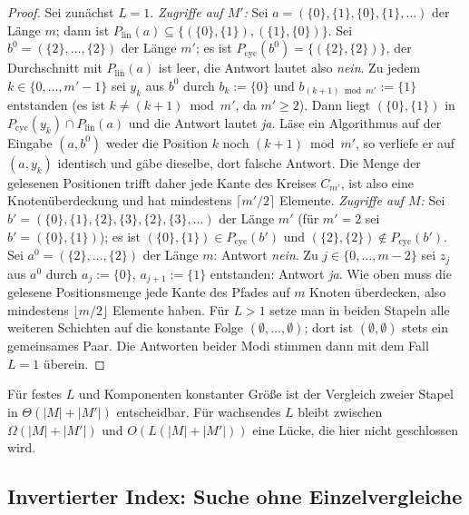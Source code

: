 \begin{proof}
	Sei zunächst $L=1$.
	\emph{Zugriffe auf $M'$:} Sei $a=(\{0\},\{1\},\{0\},\{1\},\dots)$ der Länge $m$; dann ist $P_{\mathrm{lin}}(a)\subseteq\{(\{0\},\{1\}),(\{1\},\{0\})\}$. Sei $b^0=(\{2\},\dots,\{2\})$ der Länge $m'$; es ist $P_{\mathrm{cyc}}(b^0)=\{(\{2\},\{2\})\}$, der Durchschnitt mit $P_{\mathrm{lin}}(a)$ ist leer, die Antwort lautet also \emph{nein}. Zu jedem $k\in\{0,\dots,m'-1\}$ sei $y_k$ aus $b^0$ durch $b_k:=\{0\}$ und $b_{(k+1)\bmod m'}:=\{1\}$ entstanden (es ist $k\ne(k+1)\bmod m'$, da $m'\ge2$). Dann liegt $(\{0\},\{1\})$ in $P_{\mathrm{cyc}}(y_k)\cap P_{\mathrm{lin}}(a)$ und die Antwort lautet \emph{ja}. Läse ein Algorithmus auf der Eingabe $(a,b^0)$ weder die Position $k$ noch $(k+1)\bmod m'$, so verliefe er auf $(a,y_k)$ identisch und gäbe dieselbe, dort falsche Antwort. Die Menge der gelesenen Positionen trifft daher jede Kante des Kreises $C_{m'}$, ist also eine Knotenüberdeckung und hat mindestens $\lceil m'/2\rceil$ Elemente.
	\emph{Zugriffe auf $M$:} Sei $b'=(\{0\},\{1\},\{2\},\{3\},\{2\},\{3\},\dots)$ der Länge $m'$ (für $m'=2$ sei $b'=(\{0\},\{1\})$); es ist $(\{0\},\{1\})\in P_{\mathrm{cyc}}(b')$ und $(\{2\},\{2\})\notin P_{\mathrm{cyc}}(b')$. Sei $a^0=(\{2\},\dots,\{2\})$ der Länge $m$: Antwort \emph{nein}. Zu $j\in\{0,\dots,m-2\}$ sei $z_j$ aus $a^0$ durch $a_j:=\{0\}$, $a_{j+1}:=\{1\}$ entstanden: Antwort \emph{ja}. Wie oben muss die gelesene Positionsmenge jede Kante des Pfades auf $m$ Knoten überdecken, also mindestens $\lfloor m/2\rfloor$ Elemente haben.
	Für $L>1$ setze man in beiden Stapeln alle weiteren Schichten auf die konstante Folge $(\emptyset,\dots,\emptyset)$; dort ist $(\emptyset,\emptyset)$ stets ein gemeinsames Paar. Die Antworten beider Modi stimmen dann mit dem Fall $L=1$ überein.
\end{proof}

\begin{korollar}
	Für festes $L$ und Komponenten konstanter Größe ist der Vergleich zweier Stapel in $\Theta(|M|+|M'|)$ entscheidbar. Für wachsendes $L$ bleibt zwischen $\Omega(|M|+|M'|)$ und $O(L(|M|+|M'|))$ eine Lücke, die hier nicht geschlossen wird.
\end{korollar}

\subsection{Invertierter Index: Suche ohne Einzelvergleiche}
\label{sec:univ_index}

